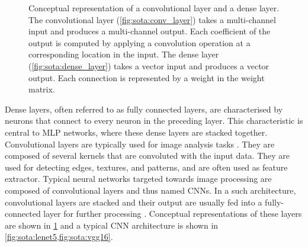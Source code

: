 \begin{figure}[htbp]
    \centering
        \caption{Conceptual representation of a convolutional layer and a dense
        layer. The convolutional layer (\cref{fig:sota:conv_layer}) takes a
        multi-channel input and produces a multi-channel output. Each coefficient of
        the output is computed by applying a convolution operation at a
        corresponding location in the input. The dense layer
        (\cref{fig:sota:dense_layer}) takes a vector input and produces a vector
        output. Each connection is represented by a weight in the weight matrix.}
    \label{fig:sota:layers}
    \end{figure}


Dense layers, often referred to as fully connected layers, are characterised by
neurons that connect to every neuron in the preceding layer. This characteristic
is central to \ac{MLP} networks, where these dense layers are stacked together.
Convolutional layers are typically used for image analysis tasks
\cite{DBLP:journals/pieee/LeCunBBH98}. They are composed of several kernels that
are convoluted with the input data. They are used for detecting edges, textures,
and patterns, and are often used as feature extractor. Typical neural networks
targeted towards image processing are composed of convolutional layers and thus
named \aclp{CNN}. In a such architecture, convolutional layers are
stacked and their output are usually fed into a fully-connected layer for
further processing
\cite{DBLP:journals/corr/SimonyanZ14a,DBLP:conf/cvpr/HeZRS16,huang2017densely}.
Conceptual representations of these layers are shown in \cref{fig:sota:layers}
and a typical \ac{CNN} architecture is shown in
\cref{fig:sota:lenet5,fig:sota:vgg16}.\\

